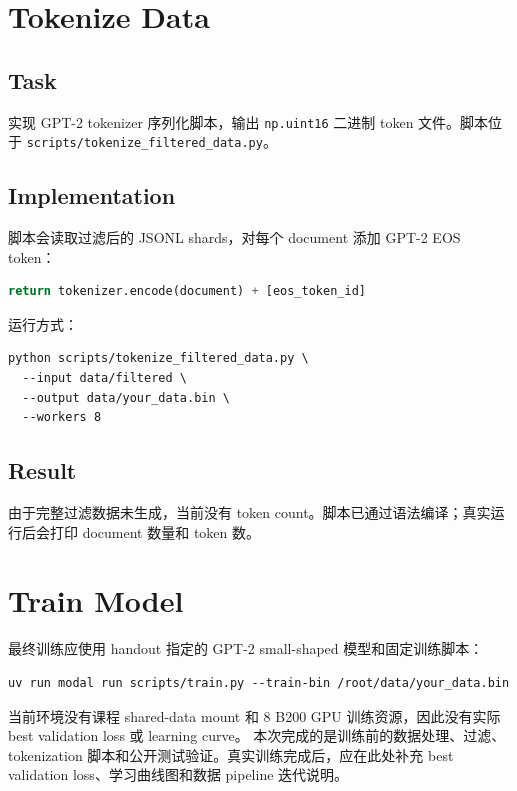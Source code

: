 \documentclass[UTF8,11pt]{ctexart}
\begin{document}
\section{Tokenize Data}

\subsection*{Task}

实现 GPT-2 tokenizer 序列化脚本，输出 \texttt{np.uint16} 二进制 token 文件。脚本位于
\texttt{scripts/tokenize\_filtered\_data.py}。

\subsection*{Implementation}

脚本会读取过滤后的 JSONL shards，对每个 document 添加 GPT-2 EOS token：

\begin{lstlisting}[language=Python]
return tokenizer.encode(document) + [eos_token_id]
\end{lstlisting}

运行方式：

\begin{lstlisting}
python scripts/tokenize_filtered_data.py \
  --input data/filtered \
  --output data/your_data.bin \
  --workers 8
\end{lstlisting}

\subsection*{Result}

由于完整过滤数据未生成，当前没有 token count。脚本已通过语法编译；真实运行后会打印 document 数量和 token 数。

\section{Train Model}

最终训练应使用 handout 指定的 GPT-2 small-shaped 模型和固定训练脚本：

\begin{lstlisting}
uv run modal run scripts/train.py --train-bin /root/data/your_data.bin
\end{lstlisting}

当前环境没有课程 shared-data mount 和 8 B200 GPU 训练资源，因此没有实际 best validation loss 或 learning curve。
本次完成的是训练前的数据处理、过滤、tokenization 脚本和公开测试验证。真实训练完成后，应在此处补充 best
validation loss、学习曲线图和数据 pipeline 迭代说明。
\end{document}
